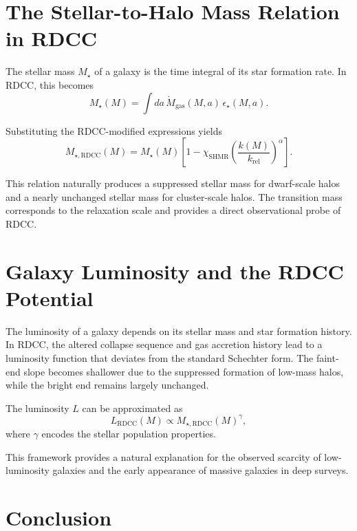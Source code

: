 \documentclass[11pt,a4paper]{article}
\begin{document}
\section{The Stellar-to-Halo Mass Relation in RDCC}

The stellar mass $M_{\star}$ of a galaxy is the time integral of its star formation 
rate. In RDCC, this becomes
\begin{equation}
    M_{\star}(M)
    = \int da\,
      \dot{M}_{\mathrm{gas}}(M,a)\,
      \epsilon_{\star}(M,a).
\end{equation}

Substituting the RDCC-modified expressions yields
\begin{equation}
    M_{\star,\mathrm{RDCC}}(M)
    = M_{\star}(M)
      \left[
        1 - \chi_{\mathrm{SHMR}}
        \left(\frac{k(M)}{k_{\mathrm{rel}}}\right)^{\alpha}
      \right].
\end{equation}

This relation naturally produces a suppressed stellar mass for dwarf-scale halos 
and a nearly unchanged stellar mass for cluster-scale halos. The transition mass 
corresponds to the relaxation scale and provides a direct observational probe of 
RDCC.
\section{Galaxy Luminosity and the RDCC Potential}

The luminosity of a galaxy depends on its stellar mass and star formation history. 
In RDCC, the altered collapse sequence and gas accretion history lead to a 
luminosity function that deviates from the standard Schechter form. The faint-end 
slope becomes shallower due to the suppressed formation of low-mass halos, while 
the bright end remains largely unchanged.

The luminosity $L$ can be approximated as
\begin{equation}
    L_{\mathrm{RDCC}}(M)
    \propto M_{\star,\mathrm{RDCC}}(M)^{\gamma},
\end{equation}
where $\gamma$ encodes the stellar population properties.

This framework provides a natural explanation for the observed scarcity of 
low-luminosity galaxies and the early appearance of massive galaxies in deep 
surveys.
\section{Conclusion}
\end{document}

